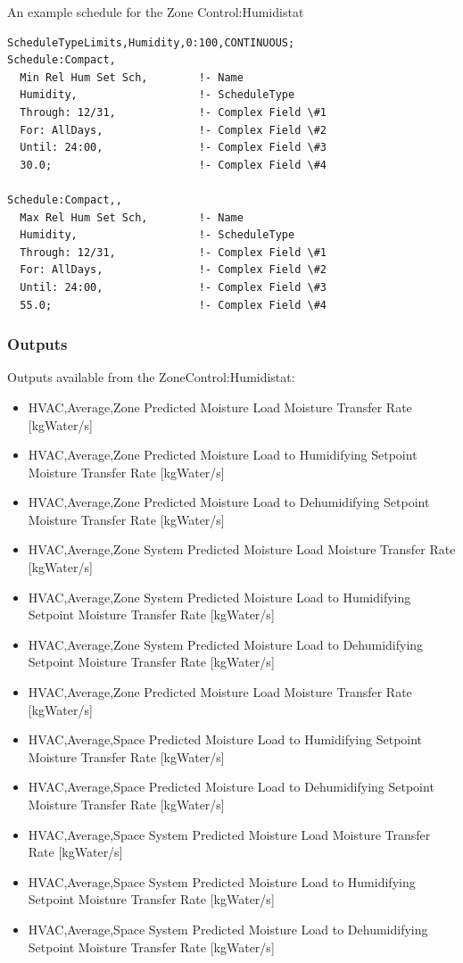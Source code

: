 An example schedule for the Zone Control:Humidistat

\begin{lstlisting}
ScheduleTypeLimits,Humidity,0:100,CONTINUOUS;
Schedule:Compact,
  Min Rel Hum Set Sch,        !- Name
  Humidity,                   !- ScheduleType
  Through: 12/31,             !- Complex Field \#1
  For: AllDays,               !- Complex Field \#2
  Until: 24:00,               !- Complex Field \#3
  30.0;                       !- Complex Field \#4

Schedule:Compact,,
  Max Rel Hum Set Sch,        !- Name
  Humidity,                   !- ScheduleType
  Through: 12/31,             !- Complex Field \#1
  For: AllDays,               !- Complex Field \#2
  Until: 24:00,               !- Complex Field \#3
  55.0;                       !- Complex Field \#4
\end{lstlisting}

\subsubsection{Outputs}\label{outputs-2-027}

Outputs available from the ZoneControl:Humidistat:

\begin{itemize}
\item
  HVAC,Average,Zone Predicted Moisture Load Moisture Transfer Rate {[}kgWater/s{]}
\item
  HVAC,Average,Zone Predicted Moisture Load to Humidifying Setpoint Moisture Transfer Rate {[}kgWater/s{]}
\item
  HVAC,Average,Zone Predicted Moisture Load to Dehumidifying Setpoint Moisture Transfer Rate {[}kgWater/s{]}
\item
  HVAC,Average,Zone System Predicted Moisture Load Moisture Transfer Rate {[}kgWater/s{]}
\item
  HVAC,Average,Zone System Predicted Moisture Load to Humidifying Setpoint Moisture Transfer Rate {[}kgWater/s{]}
\item
  HVAC,Average,Zone System Predicted Moisture Load to Dehumidifying Setpoint Moisture Transfer Rate {[}kgWater/s{]}
\item
  HVAC,Average,Zone Predicted Moisture Load Moisture Transfer Rate {[}kgWater/s{]}
\item
  HVAC,Average,Space Predicted Moisture Load to Humidifying Setpoint Moisture Transfer Rate {[}kgWater/s{]}
\item
  HVAC,Average,Space Predicted Moisture Load to Dehumidifying Setpoint Moisture Transfer Rate {[}kgWater/s{]}
\item
  HVAC,Average,Space System Predicted Moisture Load Moisture Transfer Rate {[}kgWater/s{]}
\item
  HVAC,Average,Space System Predicted Moisture Load to Humidifying Setpoint Moisture Transfer Rate {[}kgWater/s{]}
\item
  HVAC,Average,Space System Predicted Moisture Load to Dehumidifying Setpoint Moisture Transfer Rate {[}kgWater/s{]}
\end{itemize}

